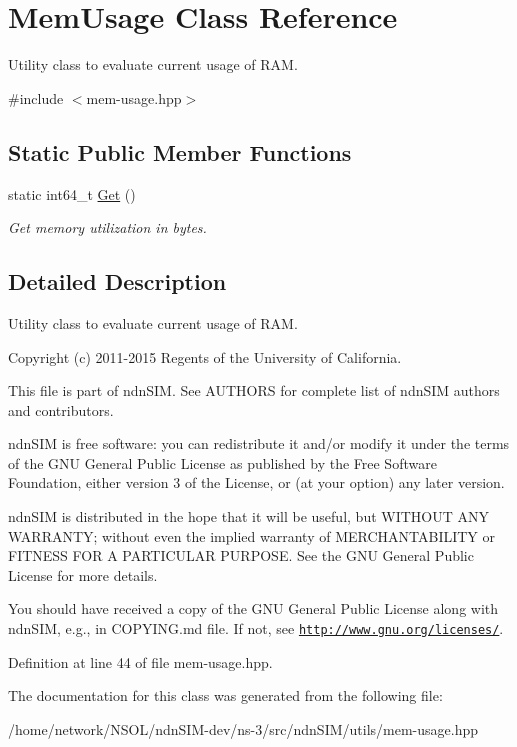 \hypertarget{classMemUsage}{}\section{Mem\+Usage Class Reference}
\label{classMemUsage}


Utility class to evaluate current usage of R\+AM.  




{\ttfamily \#include $<$mem-\/usage.\+hpp$>$}

\subsection*{Static Public Member Functions}
\begin{DoxyCompactItemize}
\item 
static int64\+\_\+t \hyperlink{classMemUsage_a5fde3f6e4131ae833da1e8ef2d0ea914}{Get} ()\hypertarget{classMemUsage_a5fde3f6e4131ae833da1e8ef2d0ea914}{}\label{classMemUsage_a5fde3f6e4131ae833da1e8ef2d0ea914}

\begin{DoxyCompactList}\small\item\em Get memory utilization in bytes. \end{DoxyCompactList}\end{DoxyCompactItemize}


\subsection{Detailed Description}
Utility class to evaluate current usage of R\+AM. 

Copyright (c) 2011-\/2015 Regents of the University of California.

This file is part of ndn\+S\+IM. See A\+U\+T\+H\+O\+RS for complete list of ndn\+S\+IM authors and contributors.

ndn\+S\+IM is free software\+: you can redistribute it and/or modify it under the terms of the G\+NU General Public License as published by the Free Software Foundation, either version 3 of the License, or (at your option) any later version.

ndn\+S\+IM is distributed in the hope that it will be useful, but W\+I\+T\+H\+O\+UT A\+NY W\+A\+R\+R\+A\+N\+TY; without even the implied warranty of M\+E\+R\+C\+H\+A\+N\+T\+A\+B\+I\+L\+I\+TY or F\+I\+T\+N\+E\+SS F\+OR A P\+A\+R\+T\+I\+C\+U\+L\+AR P\+U\+R\+P\+O\+SE. See the G\+NU General Public License for more details.

You should have received a copy of the G\+NU General Public License along with ndn\+S\+IM, e.\+g., in C\+O\+P\+Y\+I\+N\+G.\+md file. If not, see \href{http://www.gnu.org/licenses/}{\tt http\+://www.\+gnu.\+org/licenses/}. 

Definition at line 44 of file mem-\/usage.\+hpp.



The documentation for this class was generated from the following file\+:\begin{DoxyCompactItemize}
\item 
/home/network/\+N\+S\+O\+L/ndn\+S\+I\+M-\/dev/ns-\/3/src/ndn\+S\+I\+M/utils/mem-\/usage.\+hpp\end{DoxyCompactItemize}
